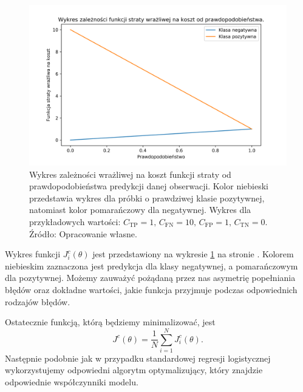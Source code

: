 \documentclass[inzynierska]{pwr_wmat_praca_dyplomowa}
\theoremstyle{plain}
\numberwithin{theorem}{chapter}
\theoremstyle{definition}
\numberwithin{theorem}{chapter}
\begin{document}
\begin{figure}[h]
	\includegraphics[width=\linewidth]{images/cost_sensitive_ce.png}
	\caption{Wykres zależności wrażliwej na koszt funkcji straty od prawdopodobieństwa predykcji danej obserwacji. Kolor niebieski przedstawia wykres dla próbki o prawdziwej klasie pozytywnej, natomiast kolor pomarańczowy dla negatywnej. Wykres dla przykładowych wartości: $C_{\text{TP}} = 1 \text{, } C_{\text{FN}} = 10 \text{, } C_{\text{FP}} = 1 \text{, } C_{\text{TN}} = 0$. Źródło: Opracowanie własne.}
	\label{fig:cost-sensitive-loss-function}
\end{figure}

Wykres funkcji $J^c_i(\theta)$ jest przedstawiony na wykresie \ref{fig:cost-sensitive-loss-function} na stronie \pageref{fig:cost-sensitive-loss-function}. Kolorem niebieskim zaznaczona jest predykcja dla klasy negatywnej, a pomarańczowym dla pozytywnej. Możemy zauważyć pożądaną przez nas asymetrię popełniania błędów oraz dokładne wartości, jakie funkcja przyjmuje podczas odpowiednich rodzajów błędów.

Ostatecznie funkcją, którą będziemy minimalizować, jest 
$$ J^c(\theta) = \frac{1}{N} \sum_{i=1}^{N} J^c_i(\theta) \text{.} $$
Następnie podobnie jak w przypadku standardowej regresji logistycznej wykorzystujemy odpowiedni algorytm optymalizujący, który znajdzie odpowiednie współczynniki modelu.
\end{document}
